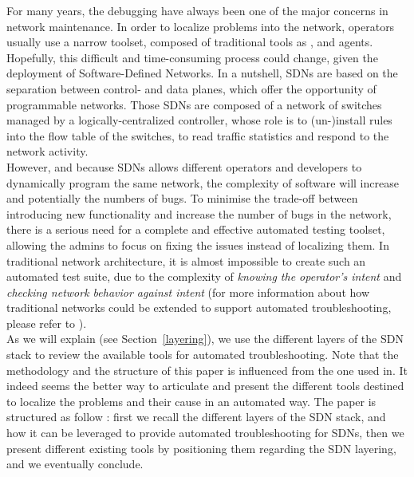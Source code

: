 \documentclass[10pt,article]{IEEEtran}
\begin{document}
For many years, the debugging have always been one of the major concerns in network maintenance. In order to localize problems into the network, operators usually use a narrow toolset, composed of traditional tools as \verb@ping@, \verb@traceroute@ and \verb@SNMP@ agents\cite{zeng2012automatic}.\\
Hopefully, this difficult and time-consuming\cite{zeng2012automatic} process could change, given the deployment of Software-Defined Networks. In a nutshell, SDNs are based on the separation between control- and data planes, which offer the opportunity of programmable networks\cite{mckeown2008openflow}. Those SDNs are composed of a network of switches managed by a logically-centralized controller, whose role is to (un-)install rules into the flow table of the switches, to read traffic statistics and respond to the network activity.\\
However, and because SDNs allows different operators and developers to dynamically program the same network, the complexity of software will increase\cite{Sherwood:2010:PNT:1924943.1924969} and potentially the numbers of bugs.
To minimise the trade-off between introducing new functionality and  increase the number of bugs in the network, there is a serious need for a complete and effective automated testing toolset, allowing the admins to focus on fixing the issues instead of localizing them. In traditional network architecture, it is almost impossible to create such an automated test suite, due to the complexity of \textit{knowing the operator's intent} and \textit{checking network behavior against intent}\cite{Heller:2013:LSL:2491185.2491197} (for more information about how traditional networks could be extended to support automated troubleshooting, please refer to \cite{Heller:2013:LSL:2491185.2491197}).\\
As we will explain (see Section~\ref{layering}), we use the different layers of the SDN stack to review the available tools for automated troubleshooting. Note that the methodology and the structure of this paper is influenced from the one used in\cite{Heller:2013:LSL:2491185.2491197}. It indeed seems the better way to articulate and present the different tools destined to localize the problems and their cause in an automated way.
The paper is structured as follow : first we recall the different layers of the SDN stack, and how it can be leveraged to provide automated troubleshooting for SDNs, then we present different existing tools by positioning them regarding the SDN layering, and we eventually conclude.
\end{document}
